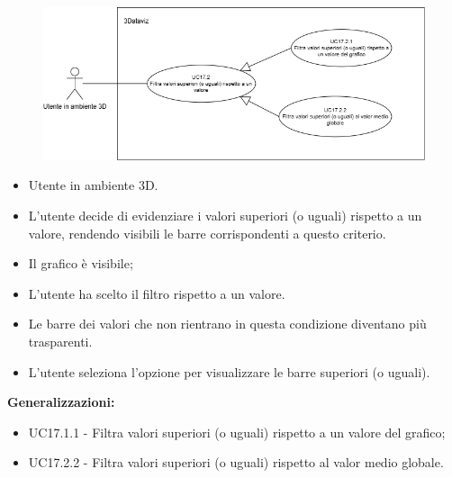 \begin{figure}[H]\centering
    \includegraphics[scale=0.6]{template/images/UC17.2.png}
    \caption{}
\end{figure}
\UCdsc
{ %
    \begin{itemize}
        \item Utente in ambiente 3D.
    \end{itemize}
}
{ %
    \begin{itemize}
        \item L'utente decide di evidenziare i valori superiori (o uguali) rispetto a un valore, rendendo visibili le barre corrispondenti a questo criterio.
    \end{itemize}
}
{ %
    \begin{itemize}
        \item Il grafico è visibile;
        \item L'utente ha scelto il filtro rispetto a un valore.
    \end{itemize}
}
{ %
    \begin{itemize}
        \item Le barre dei valori che non rientrano in questa condizione diventano più trasparenti.
    \end{itemize}
}
{ %
    \begin{itemize}
        \item L'utente seleziona l'opzione per visualizzare le barre superiori (o uguali).
    \end{itemize}
    \item \textbf{Generalizzazioni:} \begin{itemize}
        \item UC17.1.1 - Filtra valori superiori (o uguali) rispetto a un valore del grafico;
        \item UC17.2.2 - Filtra valori superiori (o uguali) rispetto al valor medio globale.
    \end{itemize}
}


